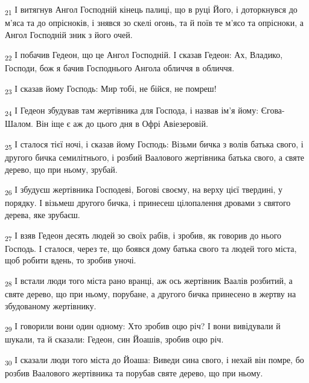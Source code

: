 \begin{tcolorbox}
\textsubscript{21} І витягнув Ангол Господній кінець палиці, що в руці Його, і доторкнувся до м'яса та до опрісноків, і знявся зо скелі огонь, та й поїв те м'ясо та опрісноки, а Ангол Господній зник з його очей.
\end{tcolorbox}
\begin{tcolorbox}
\textsubscript{22} І побачив Гедеон, що це Ангол Господній. І сказав Гедеон: Ах, Владико, Господи, бож я бачив Господнього Ангола обличчя в обличчя.
\end{tcolorbox}
\begin{tcolorbox}
\textsubscript{23} І сказав йому Господь: Мир тобі, не бійся, не помреш!
\end{tcolorbox}
\begin{tcolorbox}
\textsubscript{24} І Гедеон збудував там жертівника для Господа, і назвав ім'я йому: Єгова-Шалом. Він іще є аж до цього дня в Офрі Авіезеровій.
\end{tcolorbox}
\begin{tcolorbox}
\textsubscript{25} І сталося тієї ночі, і сказав йому Господь: Візьми бичка з волів батька свого, і другого бичка семилітнього, і розбий Ваалового жертівника батька свого, а святе дерево, що при ньому, зрубай.
\end{tcolorbox}
\begin{tcolorbox}
\textsubscript{26} І збудуєш жертівника Господеві, Богові своєму, на верху цієї твердині, у порядку. І візьмеш другого бичка, і принесеш цілопалення дровами з святого дерева, яке зрубаєш.
\end{tcolorbox}
\begin{tcolorbox}
\textsubscript{27} І взяв Гедеон десять людей зо своїх рабів, і зробив, як говорив до нього Господь. І сталося, через те, що боявся дому батька свого та людей того міста, щоб робити вдень, то зробив уночі.
\end{tcolorbox}
\begin{tcolorbox}
\textsubscript{28} І встали люди того міста рано вранці, аж ось жертівник Ваалів розбитий, а святе дерево, що при ньому, порубане, а другого бичка принесено в жертву на збудованому жертівнику.
\end{tcolorbox}
\begin{tcolorbox}
\textsubscript{29} І говорили вони один одному: Хто зробив оцю річ? І вони вивідували й шукали, та й сказали: Гедеон, син Йоашів, зробив оцю річ.
\end{tcolorbox}
\begin{tcolorbox}
\textsubscript{30} І сказали люди того міста до Йоаша: Виведи сина свого, і нехай він помре, бо розбив Ваалового жертівника та порубав святе дерево, що при ньому.
\end{tcolorbox}

